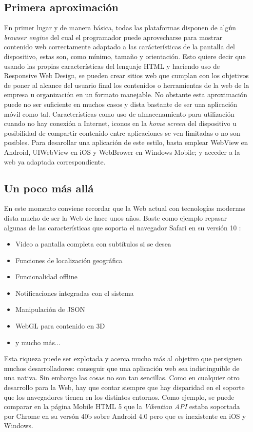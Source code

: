 \documentclass[
10pt, %
a4paper, %
oneside, %
headinclude,footinclude, %
BCOR5mm, %
]{scrartcl}
\begin{document}
\subsection{Primera aproximación}
En primer lugar y de manera básica, todas las plataformas disponen de algún \textit{browser engine} del cual el programador puede aprovecharse para mostrar contenido web correctamente adaptado a las carácterísticas de la pantalla del dispositivo, estas son, como mínimo, tamaño y orientación. Esto quiere decir que usando las propias características del lenguaje HTML y haciendo uso de Responsive Web Design, se pueden crear sitios web que cumplan con los objetivos de poner al alcance del usuario final los contenidos o herramientas de la web de la empresa u organización en un formato manejable. No obstante esta aproximación puede no ser suficiente en muchos casos y dista bastante de ser una aplicación móvil como tal. Características como uso de almacenamiento para utilización cuando no hay conexión a Internet, iconos en la \textit{home screen} del dispositivo u posibilidad de compartir contenido entre aplicaciones se ven limitadas o no son posibles. Para desarollar una aplicación de este estilo, basta emplear WebView en Android, UIWebView en iOS y WebBrower en Windows Mobile; y acceder a la web ya adaptada correspondiente.

\subsection{Un poco más allá}
En este momento conviene recordar que la Web actual con tecnologías modernas dista mucho de ser la Web de hace unos años. Baste como ejemplo repasar algunas de las características que soporta el navegador Safari en su versión 10 \cite{apple_inc._features_2016}:
\begin{itemize}[noitemsep]
\item Video a pantalla completa con subtítulos si se desea
\item Funciones de localización geográfica
\item Funcionalidad offline
\item Notificaciones integradas con el sistema
\item Manipulación de JSON
\item WebGL para contenido en 3D
\item y mucho más...
\end{itemize}

Esta riqueza puede ser explotada y acerca mucho más al objetivo que persiguen muchos desarrolladores: conseguir que una aplicación web sea indistinguible de una nativa. Sin embargo las cosas no son tan sencillas. Como en cualquier otro desarrollo para la Web, hay que contar siempre que hay disparidad en el soporte que los navegadores tienen en los distintos entornos. Como ejemplo, se puede comparar en la página Mobile HTML 5 \cite{maximiliano_firtman_html5_2015} que la \textit{Vibration API} estaba soportada por Chrome en su versón 40b sobre Android 4.0 pero que es inexistente en iOS y Windows.
\end{document}
